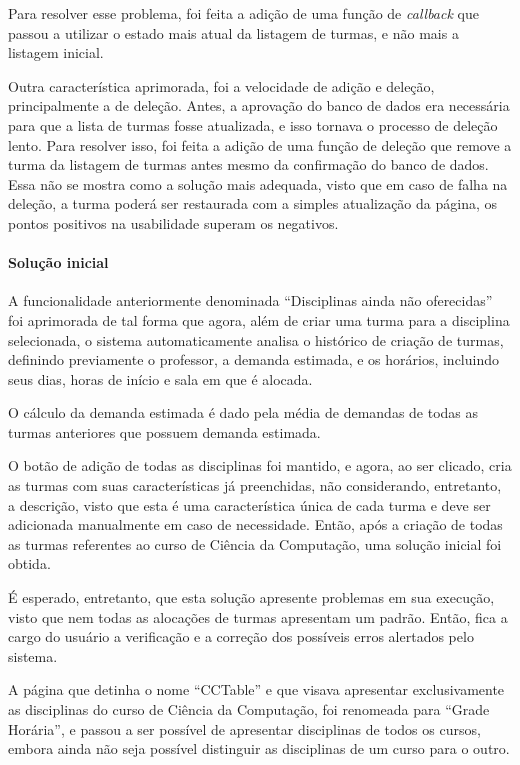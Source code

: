 Para resolver esse problema, foi feita a adição de uma função de \textit{callback} que passou a utilizar o estado mais atual da listagem de turmas, e não mais a listagem inicial.

Outra característica aprimorada, foi a velocidade de adição e deleção, principalmente a de deleção. Antes, a aprovação do banco de dados era necessária para que a lista de turmas fosse atualizada, e isso tornava o processo de deleção lento. Para resolver isso, foi feita a adição de uma função de deleção que remove a turma da listagem de turmas antes mesmo da confirmação do banco de dados. Essa não se mostra como a solução mais adequada, visto que em caso de falha na deleção, a turma poderá ser restaurada com a simples atualização da página, os pontos positivos na usabilidade superam os negativos.

\paragraph*{Solução inicial} \label{par:Solução inicial}

A funcionalidade anteriormente denominada ``Disciplinas ainda não oferecidas'' foi aprimorada de tal forma que agora, além de criar uma turma para a disciplina selecionada, o sistema automaticamente analisa o histórico de criação de turmas, definindo previamente o professor, a demanda estimada, e os horários, incluindo seus dias, horas de início e sala em que é alocada.

O cálculo da demanda estimada é dado pela média de demandas de todas as turmas anteriores que possuem demanda estimada.

O botão de adição de todas as disciplinas foi mantido, e agora, ao ser clicado, cria as turmas com suas características já preenchidas, não considerando, entretanto, a descrição, visto que esta é uma característica única de cada turma e deve ser adicionada manualmente em caso de necessidade. Então, após a criação de todas as turmas referentes ao curso de Ciência da Computação, uma solução inicial foi obtida.

É esperado, entretanto, que esta solução apresente problemas em sua execução, visto que nem todas as alocações de turmas apresentam um padrão. Então, fica a cargo do usuário a verificação e a correção dos possíveis erros alertados pelo sistema.

 \label{ssssec:Grade Horária}

A página que detinha o nome ``CCTable'' e que visava apresentar exclusivamente as disciplinas do curso de Ciência da Computação, foi renomeada para ``Grade Horária'', e passou a ser possível de apresentar disciplinas de todos os cursos, embora ainda não seja possível distinguir as disciplinas de um curso para o outro.

